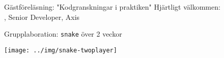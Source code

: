 

\ifkompendium\else




\begin{Slide}{Gästföreläsning: "Kodgranskningar i praktiken"}
Hjärtligt välkommen: \\ , Senior Developer, Axis
\end{Slide}



\begin{Slide}{Grupplaboration: \texttt{snake} över 2 veckor}
\begin{minipage}{0.6\textwidth}
\texttt{[image: ../img/snake-twoplayer]}
\end{minipage}%
\begin{minipage}{0.4\textwidth}
\begin{itemize}

\end{itemize}
\end{minipage}%
\end{Slide}



